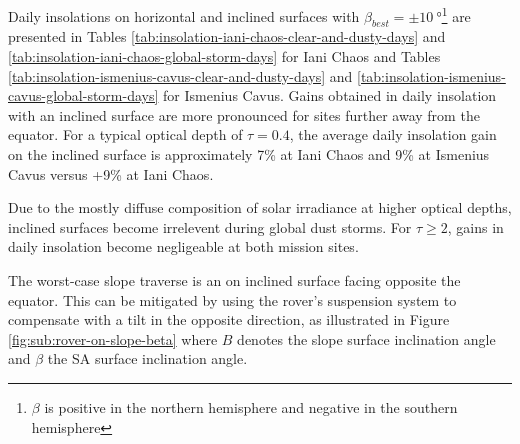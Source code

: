 \clearpage

Daily insolations on horizontal and inclined surfaces with $\beta_{best}=\pm\SI{10}{\degree}$\footnote{$\beta$ is positive in the northern hemisphere and negative in the southern hemisphere} are presented in Tables \ref{tab:insolation-iani-chaos-clear-and-dusty-days} and \ref{tab:insolation-iani-chaos-global-storm-days} for Iani Chaos and Tables \ref{tab:insolation-ismenius-cavus-clear-and-dusty-days} and \ref{tab:insolation-ismenius-cavus-global-storm-days} for Ismenius Cavus. Gains obtained in daily insolation with an inclined surface are more pronounced for sites further away from the equator. For a typical optical depth of $\tau = 0.4$, the average daily insolation gain on the inclined surface is approximately 7\% at Iani Chaos and 9\% at Ismenius Cavus versus +9\% at Iani Chaos.





Due to the mostly diffuse composition of solar irradiance at higher optical depths, inclined surfaces become irrelevent during global dust storms. For $\tau \geq 2$, gains in daily insolation become negligeable at both mission sites.


\clearpage




The worst-case slope traverse is an on inclined surface facing opposite the equator. This can be mitigated by using the rover's suspension system to compensate with a tilt in the opposite direction, as illustrated in Figure \ref{fig:sub:rover-on-slope-beta} where $B$ denotes the slope surface inclination angle and $\beta$ the \ac{SA} surface inclination angle.

\vspace{0.5cm}

